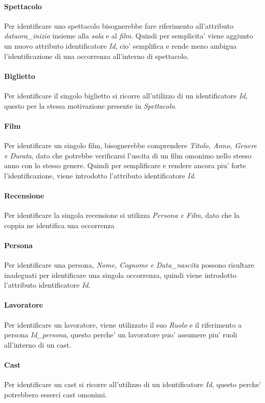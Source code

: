 \documentclass[10pt]{article}
\begin{document}
	\paragraph{Spettacolo}
	Per identificare uno spettacolo bisognerebbe fare riferimento all'attributo \textit{dataora\_inizio} insieme alla \textit{sala} e al \textit{film}. Quindi per semplicita' viene aggiunto un nuovo attributo identificatore \textit{Id}, cio' semplifica e rende meno ambigua l'identificazione di una occorrenza all'interno di spettacolo.
	\paragraph{Biglietto}
	Per identificare il singolo biglietto si ricorre all'utilizzo di un identificatore \textit{Id}, questo per la stessa motivazione presente in \textit{Spettacolo}.
	\paragraph{Film}
	Per identificare un singolo film, bisognerebbe comprendere \textit{Titolo, Anno, Genere e Durata}, dato che potrebbe verificarsi l'uscita di un film omonimo nello stesso anno con lo stesso genere. Quindi per semplificare e rendere ancora piu' forte l'identificazione, viene introdotto l'attributo identificatore \textit{Id}.
	\paragraph{Recensione}
	Per identificare la singola recensione si utilizza \textit{Persona e Film}, dato che la coppia ne identifica una occorrenza
	\paragraph{Persona}
	Per identificare una persona, \textit{Nome, Cognome e Data\_nascita} possono risultare inadeguati per identificare una singola occorrenza, quindi viene introdotto l'attributo identificatore \textit{Id}.
	\paragraph{Lavoratore}
	Per identificare un lavoratore, viene utilizzato il suo \textit{Ruolo} e il riferimento a persona \textit{Id\_persona}, questo perche' un lavoratore puo' assumere piu' ruoli all'interno di un cast.
	\paragraph{Cast}
	Per identificare un cast si ricorre all'utilizzo di un identificatore \textit{Id}, questo perche' potrebbero esserci cast omonimi.
\end{document}
